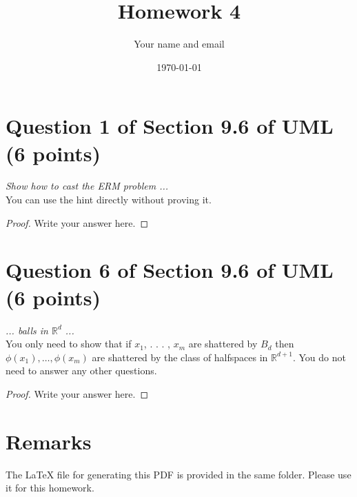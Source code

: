 \documentclass{article}
\title{Homework 4}
\author{Your name and email}
\date{\today}
\begin{document}
\maketitle

\section{Question 1 of Section 9.6 of UML (6 points)}
\emph{Show how to cast the ERM problem ...} \\
You can use the hint directly without proving it.
\begin{proof}
    Write your answer here.
\end{proof}
\section{Question 6 of Section 9.6 of UML (6 points)}
\emph{... balls in $\mathbb{R}^d$ ...} \\
You only need to show that if $x_1$, . . . , $x_m$ are shattered by $B_d$ then $\phi(x_1), \dots, \phi(x_m)$ are shattered by the class of halfspaces in $\mathbb{R}^{d+1}$. 
You do not need to answer any other questions.
\begin{proof}
    Write your answer here.
\end{proof}

\section{Remarks}

The \LaTeX{} file for generating this PDF is provided in the same folder. 
Please use it for this homework.
\end{document}
